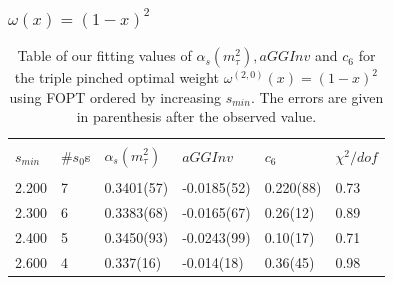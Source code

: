 \documentclass[../../index.tex]{subfiles}
\begin{document}
\subsubsection{$\omega(x) = (1-x)^2$}
\begin{table}[H]
  \centering
  \begin{tabular}{llllll}
    \toprule \\
    $s_{min}$ & \#$s_0$s & $\alpha_s(m_\tau^2)$ & $aGGInv$ & $c_{6}$ & $\chi^2/dof$  \\
    \hline \\

    2.200 & 7  & 0.3401(57) & -0.0185(52) & 0.220(88) & 0.73 \\
    2.300 & 6  & 0.3383(68) & -0.0165(67) & 0.26(12) & 0.89 \\
    2.400 & 5  & 0.3450(93) & -0.0243(99) & 0.10(17) & 0.71 \\
    2.600 & 4  & 0.337(16) & -0.014(18) & 0.36(45) & 0.98 \\
    \bottomrule
  \end{tabular}
  \caption{Table of our fitting values of $\alpha_s(m_\tau^2), aGGInv$ and $c_{6}$
    for the triple pinched optimal weight $\omega^{(2,0)}(x)=(1-x)^2$ using FOPT ordered
    by increasing $s_{min}$. The errors are given in parenthesis after the observed value.}
  \label{table:fitOpt30AlD4D6}
\end{table}
\end{document}
